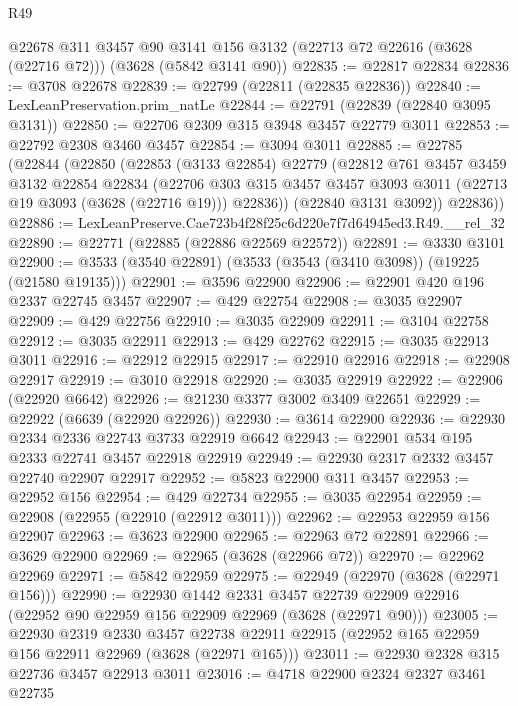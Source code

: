 \begin{lexlean}{R49}
\begin{coremodule}
    @22678
    @311
    @3457
    @90
    @3141
    @156
    @3132
    (@22713 @72 @22616 (@3628 (@22716 @72)))
    (@3628 (@5842 @3141 @90))
@22835 := @22817 @22834
@22836 := @3708 @22678
@22839 := @22799 (@22811 (@22835 @22836))
@22840 := LexLeanPreservation.prim_natLe
@22844 := @22791 (@22839 (@22840 @3095 @3131))
@22850 := @22706 @2309 @315 @3948 @3457 @22779 @3011
@22853 := @22792 @2308 @3460 @3457
@22854 := @3094 @3011
@22885 := @22785
    (@22844
      (@22850
        (@22853
          (@3133 @22854)
          @22779
          (@22812
            @761
            @3457
            @3459
            @3132
            @22854
            @22834
            (@22706
              @303
              @315
              @3457
              @3457
              @3093
              @3011
              (@22713 @19 @3093 (@3628 (@22716 @19)))
              @22836))
          (@22840 @3131 @3092))
        @22836))
@22886 := LexLeanPreserve.Cae723b4f28f25c6d220e7f7d64945ed3.R49.__rel_32
@22890 := @22771 (@22885 (@22886 @22569 @22572))
@22891 := @3330 @3101
@22900 := @3533 (@3540 @22891) (@3533 (@3543 (@3410 @3098)) (@19225 (@21580 @19135)))
@22901 := @3596 @22900
@22906 := @22901 @420 @196 @2337 @22745 @3457
@22907 := @429 @22754
@22908 := @3035 @22907
@22909 := @429 @22756
@22910 := @3035 @22909
@22911 := @3104 @22758
@22912 := @3035 @22911
@22913 := @429 @22762
@22915 := @3035 @22913 @3011
@22916 := @22912 @22915
@22917 := @22910 @22916
@22918 := @22908 @22917
@22919 := @3010 @22918
@22920 := @3035 @22919
@22922 := @22906 (@22920 @6642)
@22926 := @21230 @3377 @3002 @3409 @22651
@22929 := @22922 (@6639 (@22920 @22926))
@22930 := @3614 @22900
@22936 := @22930 @2334 @2336 @22743 @3733 @22919 @6642
@22943 := @22901 @534 @195 @2333 @22741 @3457 @22918 @22919
@22949 := @22930 @2317 @2332 @3457 @22740 @22907 @22917
@22952 := @5823 @22900 @311 @3457
@22953 := @22952 @156
@22954 := @429 @22734
@22955 := @3035 @22954
@22959 := @22908 (@22955 (@22910 (@22912 @3011)))
@22962 := @22953 @22959 @156 @22907
@22963 := @3623 @22900
@22965 := @22963 @72 @22891
@22966 := @3629 @22900
@22969 := @22965 (@3628 (@22966 @72))
@22970 := @22962 @22969
@22971 := @5842 @22959
@22975 := @22949 (@22970 (@3628 (@22971 @156)))
@22990 := @22930
    @1442
    @2331
    @3457
    @22739
    @22909
    @22916
    (@22952 @90 @22959 @156 @22909 @22969 (@3628 (@22971 @90)))
@23005 := @22930
    @2319
    @2330
    @3457
    @22738
    @22911
    @22915
    (@22952 @165 @22959 @156 @22911 @22969 (@3628 (@22971 @165)))
@23011 := @22930 @2328 @315 @22736 @3457 @22913 @3011
@23016 := @4718 @22900 @2324 @2327 @3461 @22735

\end{coremodule}
\end{lexlean}
